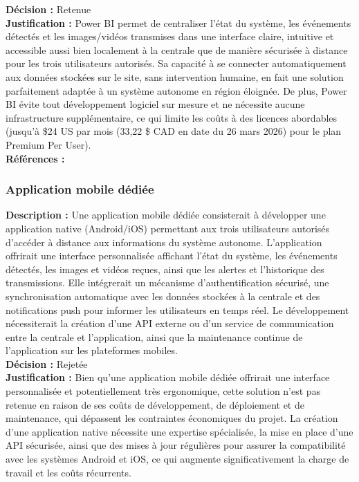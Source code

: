 \noindent
\textbf{Décision :} Retenue \\

\noindent
\textbf{Justification :} Power BI permet de centraliser l’état du système, les
événements détectés et les images/vidéos transmises dans une interface claire,
intuitive et accessible aussi bien localement à la centrale que de manière
sécurisée à distance pour les trois utilisateurs autorisés. Sa capacité à se
connecter automatiquement aux données stockées sur le site, sans intervention
humaine, en fait une solution parfaitement adaptée à un système autonome en
région éloignée. De plus, Power BI évite tout développement logiciel sur mesure
et ne nécessite aucune infrastructure supplémentaire, ce qui limite les coûts à
des licences abordables (jusqu’à \$24 US par mois (33,22 \$ CAD en date du 26
mars 2026) pour le plan Premium Per User). \\

\noindent
\textbf{Références :} \cite{12} \cite{13} \cite{14} \cite{15} \\

\subsubsection{Application mobile dédiée}

\noindent
\textbf{Description :} Une application mobile dédiée consisterait à développer une
application native (Android/iOS) permettant aux trois utilisateurs autorisés
d’accéder à distance aux informations du système autonome. L’application
offrirait une interface personnalisée affichant l’état du système, les
événements détectés, les images et vidéos reçues, ainsi que les alertes et
l’historique des transmissions. Elle intégrerait un mécanisme
d’authentification sécurisé, une synchronisation automatique avec les données
stockées à la centrale et des notifications push pour informer les utilisateurs
en temps réel. Le développement nécessiterait la création d’une API externe ou
d’un service de communication entre la centrale et l’application, ainsi que la
maintenance continue de l’application sur les plateformes mobiles. \\

\noindent
\textbf{Décision :} Rejetée \\

\noindent
\textbf{Justification :} Bien qu’une application mobile dédiée offrirait une
interface personnalisée et potentiellement très ergonomique, cette solution
n’est pas retenue en raison de ses coûts de développement, de déploiement et de
maintenance, qui dépassent les contraintes économiques du projet. La création
d’une application native nécessite une expertise spécialisée, la mise en place
d’une API sécurisée, ainsi que des mises à jour régulières pour assurer la
compatibilité avec les systèmes Android et iOS, ce qui augmente
significativement la charge de travail et les coûts récurrents. \\

